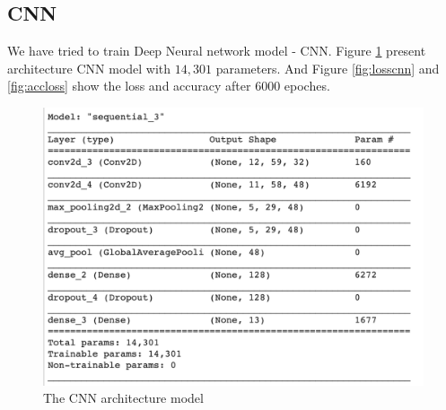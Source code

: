 \documentclass[%
  article,%
  10pt,%
  a4paper,%
  fleqn,%
  oneside,%
  sumario = tradicional,%
  chapter = TITLE,%
  section = TITLE,%
]{abntex2}
\begin{document}
\subsection{CNN}
We have tried to train Deep Neural network model - CNN. Figure \ref{fig:cnnarch} present architecture CNN model with $14,301$ parameters. And Figure \ref{fig:losscnn} and \ref{fig:accloss} show the loss and accuracy after 6000 epoches.
\begin{figure}[H]
  \centering
  \includegraphics[width = 0.7\columnwidth]{./Figuras/cnnarch}
   \caption{The CNN architecture model}
   \label{fig:cnnarch}
\end{figure}
\end{document}
